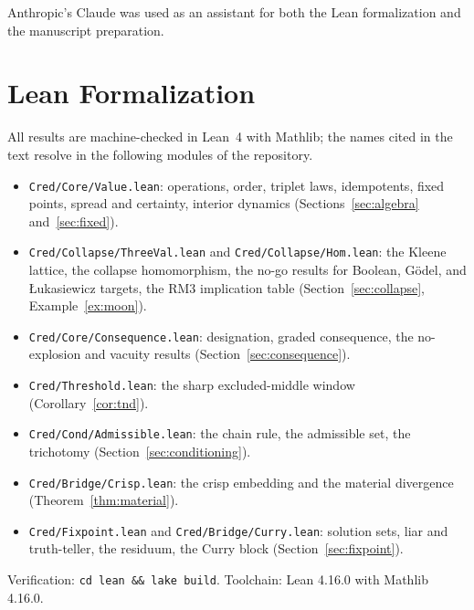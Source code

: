 \documentclass[11pt,a4paper]{article}
\begin{document}
Anthropic's Claude was used as an assistant for both the Lean
formalization and the manuscript preparation.





\appendix

\section{Lean Formalization}
\label{app:lean}

All results are machine-checked in Lean~4 with Mathlib; the names
cited in the text resolve in the following modules of the repository.

\begin{itemize}[nosep]
\item \texttt{Cred/Core/Value.lean}: operations, order, triplet laws,
  idempotents, fixed points, spread and certainty, interior dynamics
  (Sections~\ref{sec:algebra} and~\ref{sec:fixed}).
\item \texttt{Cred/Collapse/ThreeVal.lean} and
  \texttt{Cred/Collapse/Hom.lean}: the Kleene lattice, the collapse
  homomorphism, the no-go results for Boolean, G\"odel, and
  \L ukasiewicz targets, the RM3 implication table
  (Section~\ref{sec:collapse}, Example~\ref{ex:moon}).
\item \texttt{Cred/Core/Consequence.lean}: designation, graded
  consequence, the no-explosion and vacuity results
  (Section~\ref{sec:consequence}).
\item \texttt{Cred/Threshold.lean}: the sharp excluded-middle window
  (Corollary~\ref{cor:tnd}).
\item \texttt{Cred/Cond/Admissible.lean}: the chain rule, the
  admissible set, the trichotomy
  (Section~\ref{sec:conditioning}).
\item \texttt{Cred/Bridge/Crisp.lean}: the crisp embedding and the
  material divergence (Theorem~\ref{thm:material}).
\item \texttt{Cred/Fixpoint.lean} and \texttt{Cred/Bridge/Curry.lean}:
  solution sets, liar and truth-teller, the residuum, the Curry block
  (Section~\ref{sec:fixpoint}).
\end{itemize}

Verification: \texttt{cd lean \&\& lake build}.
Toolchain: Lean 4.16.0 with Mathlib 4.16.0.
\end{document}
